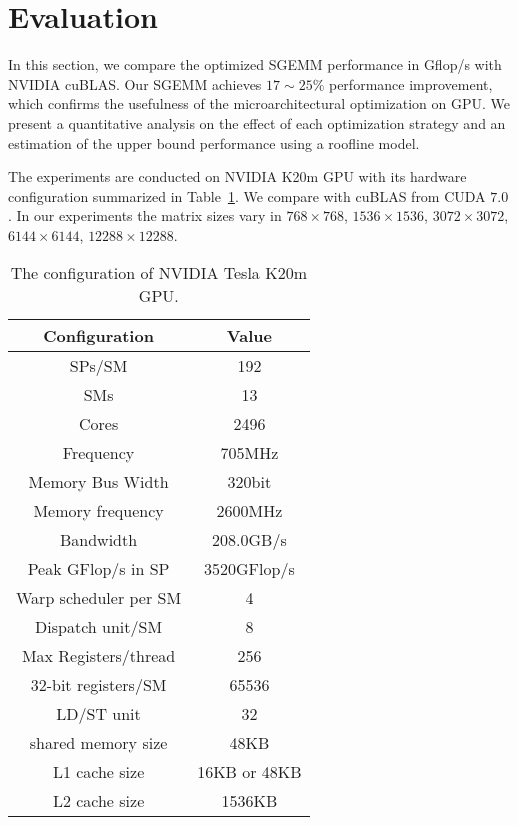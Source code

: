 \section{Evaluation}
\label{sec:experiment}


In this section, we compare the optimized SGEMM performance in Gflop/s with NVIDIA cuBLAS. 
Our SGEMM achieves $17\sim 25\%$ performance
improvement, which confirms the usefulness of the microarchitectural optimization on GPU. 
We present 
a quantitative analysis on the effect of each optimization strategy and an estimation of the upper bound performance using a roofline model.

The experiments are conducted on NVIDIA K20m GPU with its hardware configuration summarized in 
Table~\ref{table:k20}. We compare with cuBLAS from CUDA $7.0$. In our experiments the matrix sizes vary in 
$768\times768$, $1536\times1536$, $3072\times3072$, $6144\times6144$, $12288\times12288$.

\begin{table}[!t]
\caption{The configuration of NVIDIA Tesla K20m GPU.}
\centering
\scalebox{1.0} {
\begin{tabular}{|c|c|}
\hline
Configuration& Value\\
\hline
SPs/SM &192\\
\hline
SMs&13\\
\hline
Cores &2496\\
\hline
Frequency&705MHz\\
\hline
Memory Bus Width&320bit \\
\hline
Memory frequency&2600MHz\\
\hline
Bandwidth&208.0GB/s\\
\hline
Peak GFlop/s in SP&3520GFlop/s\\
\hline
Warp scheduler per SM&4\\
\hline
Dispatch unit/SM&8\\
\hline
Max Registers/thread&256 \\
\hline
32-bit registers/SM&65536\\
\hline
LD/ST unit&32 \\
\hline
shared memory size&48KB\\
\hline
L1 cache size&16KB or 48KB\\
\hline
L2 cache size&1536KB\\
\hline
\end{tabular}
}
\label{table:k20}
\end{table}


